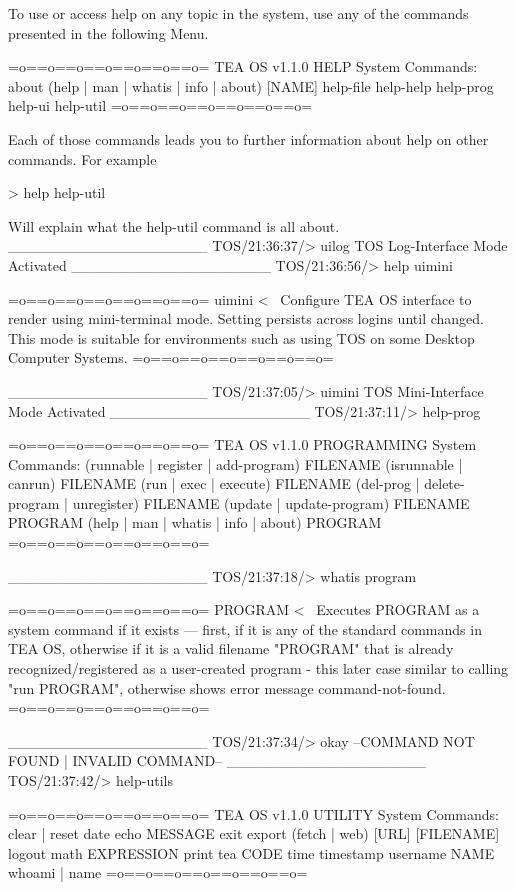 \documentclass{article}
\begin{document}
\begin{tcbverbatim}[title=TEA OS v1.1.0 Work Session, breakable]
To use or access help on any topic in the system, use any of the commands presented in the following Menu.

=o==o==o==o==o==o==o=
TEA OS v1.1.0 HELP System Commands:
about
(help | man | whatis | info | about) [NAME]
help-file
help-help
help-prog
help-ui
help-util
=o==o==o==o==o==o==o=

Each of those commands leads you to further information about help on other commands. For example

> help help-util

Will explain what the help-util command is all about.
___________________
TOS/21:36:37/> 
uilog
TOS Log-Interface Mode Activated
___________________
TOS/21:36:56/> 
help uimini

=o==o==o==o==o==o==o=
uimini <~ Configure TEA OS interface to render using mini-terminal mode. Setting persists across logins until changed. This mode is suitable for environments such as using TOS on some Desktop Computer Systems.
=o==o==o==o==o==o==o=

___________________
TOS/21:37:05/> 
uimini
TOS Mini-Interface Mode Activated
___________________
TOS/21:37:11/> 
help-prog

=o==o==o==o==o==o==o=
TEA OS v1.1.0 PROGRAMMING System Commands:
(runnable | register | add-program) FILENAME
(isrunnable | canrun) FILENAME
(run | exec | execute) FILENAME
(del-prog | delete-program | unregister) FILENAME
(update | update-program) FILENAME
PROGRAM
(help | man | whatis | info | about) PROGRAM
=o==o==o==o==o==o==o=

___________________
TOS/21:37:18/> 
whatis program

=o==o==o==o==o==o==o=
PROGRAM <~ Executes PROGRAM as a system command if it exists --- first, if it is any of the standard commands in TEA OS, otherwise if it is a valid filename "PROGRAM" that is already recognized/registered as a user-created program - this later case similar to calling "run PROGRAM", otherwise shows error message command-not-found.
=o==o==o==o==o==o==o=

___________________
TOS/21:37:34/> 
okay
--COMMAND NOT FOUND | INVALID COMMAND--
___________________
TOS/21:37:42/> 
help-utils

=o==o==o==o==o==o==o=
TEA OS v1.1.0 UTILITY System Commands:
clear | reset
date
echo MESSAGE
exit
export
(fetch | web) [URL] [FILENAME]
logout
math EXPRESSION
print
tea CODE
time
timestamp
username NAME
whoami | name
=o==o==o==o==o==o==o=


\end{tcbverbatim}
\end{document}
